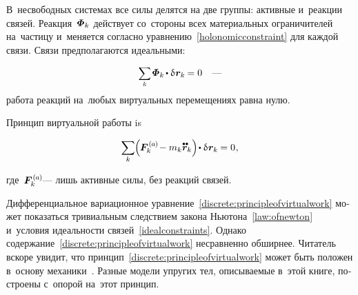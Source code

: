 \begin{otherlanguage}{russian}
В~несвободных системах все силы делятся на две группы: активные и~реакции связей.
Реакция~$\mathboldPhi_k$ действует со~стороны всех материальных ограничителей на~частицу  и~меняется согласно уравнению~\eqref{holonomicconstraint} для каждой связи.
Связи предполагаются идеальными:

\nopagebreak\begin{equation}\label{idealconstraints}
\scalebox{0.9}{$\displaystyle \sum_{\smash{k}}$} \hspace{.2ex} \mathboldPhi_k \hspace{-0.2ex} \dotp \variation{\hspace{.1ex}\locationvector_k} \hspace{-0.16ex} = 0
\quad \textrm{---}
\vspace{-0.25em}\end{equation}
\noindent
работа реакций на~любых виртуальных перемещениях равна нулю.

Принцип виртуальной работы is

\nopagebreak\vspace{-0.1em}\begin{equation}\label{discrete:principleofvirtualwork}
\displaystyle \sum_{\smash{k}} \hspace{-0.1ex} \Bigl( \hspace{-0.1ex} \bm{F}_{k}^{\smthactive} \hspace{-0.2ex} - m_k \mathdotdotabove{\locationvector}_k \Bigr) \hspace{-0.3ex} \dotp \variation{\hspace{.1ex}\locationvector_k} \hspace{-0.1ex} = 0
\hspace{.1ex} ,
\vspace{-0.3em}
\end{equation}

\noindent
где~${\bm{F}_{k}^{\smthactive}}$\:--- лишь активные силы, без реакций связей.

Дифференциальное вариационное уравнение~\eqref{discrete:principleofvirtualwork} может показаться тривиальным следствием закона Ньютона~\eqref{law:ofnewton} и~условия идеальности связей~\eqref{idealconstraints}. Однако содержание~\eqref{discrete:principleofvirtualwork} несравненно обширнее.
Читатель вскоре увидит, что принцип~\eqref{discrete:principleofvirtualwork} может быть положен в~основу механики~\cite{gantmacher}.
Разные модели упругих тел, описываемые в~этой книге, построены с~опорой на~этот принцип.


\end{otherlanguage}
